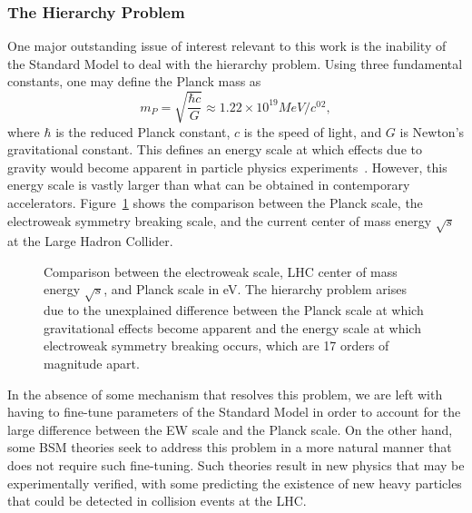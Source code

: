 \subsubsection{The Hierarchy Problem}

One major outstanding issue of interest relevant to this work is the inability of the Standard Model to deal with the hierarchy problem.
Using three fundamental constants, one may define the Planck mass as
\begin{equation}
  m_P=\sqrt{\frac{\hbar c}{G}}\approx1.22\times10^{19}\unit{MeV/\clight^2},
\end{equation}
where $\hbar$ is the reduced Planck constant, $c$ is the speed of light, and $G$ is Newton's gravitational constant.
This defines an energy scale at which effects due to gravity would become apparent in particle physics experiments~\cite{QFTNutshell}.
However, this energy scale is vastly larger than what can be obtained in contemporary accelerators.
Figure~\ref{fig:hierarchy} shows the comparison between the Planck scale, the electroweak symmetry breaking scale, and the current center of mass energy $\sqrt{s}$ at the Large Hadron Collider.

\begin{figure}[htbp]
  \centering
  
  \caption{
    Comparison between the electroweak scale, LHC center of mass energy $\sqrt{s}$, and Planck scale in eV.
    The hierarchy problem arises due to the unexplained difference between the Planck scale at which gravitational effects become apparent and the energy scale at which electroweak symmetry breaking occurs, which are 17 orders of magnitude apart.
  }
  \label{fig:hierarchy}
\end{figure}

In the absence of some mechanism that resolves this problem, we are left with having to fine-tune parameters of the Standard Model in order to account for the large difference between the EW scale and the Planck scale. %
On the other hand, some BSM theories seek to address this problem in a more natural manner that does not require such fine-tuning.
Such theories result in new physics that may be experimentally verified, with some predicting the existence of new heavy particles that could be detected in collision events at the LHC.

